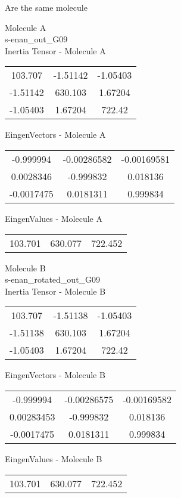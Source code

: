 \begin{center}
\vtab
\vtab
\textcolor{NavyBlue}{\Large Are the same molecule}
\end{center}
\newpage
\begin{multicols}{2}
\begin{center}
Molecule A \\ 
s-enan\_out\_G09
\\
Inertia Tensor - Molecule A \\
\vtab
\begin{tabular}{|c c c|}
103.707	 & 	-1.51142	 & 	-1.05403	 \\
-1.51142	 & 	630.103	 & 	1.67204	 \\
-1.05403	 & 	1.67204	 & 	722.42
\end{tabular}

\vtab
 EingenVectors - Molecule A     \\
\vtab
\begin{tabular}{|c c c|}
-0.999994	 & 	-0.00286582	 & 	-0.00169581	 \\
0.0028346	 & 	-0.999832	 & 	0.018136	 \\
-0.0017475	 & 	0.0181311	 & 	0.999834
\end{tabular}

\vtab
 EingenValues - Molecule A     \\
\vtab
\begin{tabular}{|c c c|}
103.701	 & 	630.077	 & 	722.452
\end{tabular}
\columnbreak

Molecule B \\ 
s-enan\_rotated\_out\_G09
\\
Inertia Tensor - Molecule B \\
\vtab
\begin{tabular}{|c c c|}
103.707	 & 	-1.51138	 & 	-1.05403	 \\
-1.51138	 & 	630.103	 & 	1.67204	 \\
-1.05403	 & 	1.67204	 & 	722.42
\end{tabular}

\vtab
 EingenVectors - Molecule B     \\
\vtab
\begin{tabular}{|c c c|}
-0.999994	 & 	-0.00286575	 & 	-0.00169582	 \\
0.00283453	 & 	-0.999832	 & 	0.018136	 \\
-0.0017475	 & 	0.0181311	 & 	0.999834
\end{tabular}

\vtab
 EingenValues - Molecule B     \\
\vtab
\begin{tabular}{|c c c|}
103.701	 & 	630.077	 & 	722.452
\end{tabular}

\end{center}
\end{multicols}
